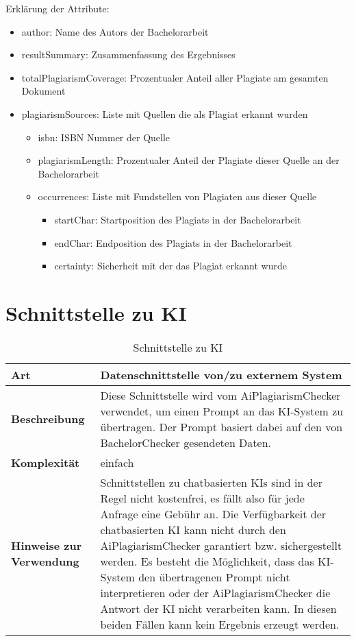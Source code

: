 Erklärung der Attribute:
\begin{itemize}
    \item author: Name des Autors der Bachelorarbeit
    \item resultSummary: Zusammenfassung des Ergebnisses
    \item totalPlagiarismCoverage: Prozentualer Anteil aller Plagiate am gesamten Dokument
    \item plagiarismSources: Liste mit Quellen die als Plagiat erkannt wurden
    \begin{itemize}
        \item isbn: ISBN Nummer der Quelle
        \item plagiarismLength: Prozentualer Anteil der Plagiate dieser Quelle an der Bachelorarbeit
        \item occurrences: Liste mit Fundstellen von Plagiaten aus dieser Quelle
        \begin{itemize}
            \item startChar: Startposition des Plagiats in der Bachelorarbeit
            \item endChar: Endposition des Plagiats in der Bachelorarbeit
            \item certainty: Sicherheit mit der das Plagiat erkannt wurde
        \end{itemize}
    \end{itemize}
\end{itemize}


\section{Schnittstelle zu KI}\label{sec:schnittstelle-ki}

\begin{table}[H]
    \label{tab:schnittstelle-ki}
    \begin{tabularx}{\textwidth}{|l|X|}
        \hline
        \textbf{Art}         & Datenschnittstelle von/zu externem System \\
        \hline
        \textbf{Beschreibung} & Diese Schnittstelle wird vom AiPlagiarismChecker verwendet, um einen Prompt an das KI-System zu übertragen.
        Der Prompt basiert dabei auf den von BachelorChecker gesendeten Daten. \\
        \hline
        \textbf{Komplexität} & einfach                                   \\
        \hline
        \textbf{Hinweise zur Verwendung} & Schnittstellen zu chatbasierten KIs sind in der Regel nicht kostenfrei, es fällt also für jede Anfrage eine Gebühr an.
        Die Verfügbarkeit der chatbasierten KI kann nicht durch den AiPlagiarismChecker garantiert bzw. sichergestellt werden.
        Es besteht die Möglichkeit, dass das KI-System den übertragenen Prompt nicht interpretieren oder der AiPlagiarismChecker die Antwort der KI nicht verarbeiten kann.
        In diesen beiden Fällen kann kein Ergebnis erzeugt werden. \\
        \hline
    \end{tabularx}
    \caption {Schnittstelle zu KI}
\end{table}

